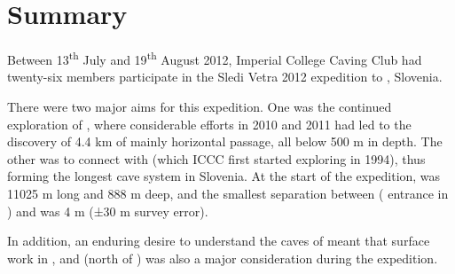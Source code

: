 \section{Summary}

Between 13\textsuperscript{th} July and 19\textsuperscript{th} August 2012, Imperial College Caving Club had
twenty-six members participate in the Sledi Vetra 2012 expedition to ,
Slovenia.

There were two major aims for this expedition. One was the continued
exploration of , where considerable efforts in 2010 and
2011 had led to the discovery of 4.4 km of mainly horizontal passage,
all below 500 m in depth. The other was to connect  with
 (which ICCC first started exploring in 1994),
thus forming the longest cave system in Slovenia. At the start of the
expedition,  was 11025 m long and 888 m deep, and the
smallest separation between  ( entrance in
) and  was 4 m (±30 m survey error).

In addition, an enduring desire to understand the caves of  meant
that surface work in ,  and  (north of ) was also a major
consideration during the expedition.

